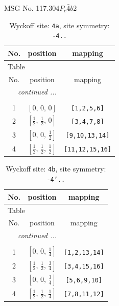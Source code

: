 \documentclass[fleqn,8pt]{jsarticle}
\begin{document}
\setcounter{MaxMatrixCols}{32}

\renewcommand{\tablename}{Table~}
\renewcommand{\figurename}{Figure~}
\begin{center}
\LARGE
MSG No. 117.304\quad$P_{c}\bar{4}b2$
\end{center}
\renewcommand{\arraystretch}{1.2}
\begin{longtable}{ccc}
\caption{Wyckoff site: {\tt 4a}, site symmetry: {\tt -4..}}
 \\
 \hline \hline
No. & position & mapping \\ \hline \endfirsthead

\multicolumn{2}{l}{\tablename\ \thetable{}} \\
 \hline \hline
No. & position & mapping \\ \hline \endhead

 \hline \hline
\multicolumn{2}{r}{\footnotesize\it continued ...} \\ \endfoot

 \hline \hline
\multicolumn{2}{r}{} \\ \endlastfoot

1 & $\left[ 0,\, 0,\, 0 \right]$ & {\tt [1,2,5,6]} \\ \hline
2 & $\left[ \frac{1}{2},\, \frac{1}{2},\, 0 \right]$ & {\tt [3,4,7,8]} \\ \hline
3 & $\left[ 0,\, 0,\, \frac{1}{2} \right]$ & {\tt [9,10,13,14]} \\ \hline
4 & $\left[ \frac{1}{2},\, \frac{1}{2},\, \frac{1}{2} \right]$ & {\tt [11,12,15,16]} \\
\end{longtable}
\renewcommand{\arraystretch}{1.2}
\begin{longtable}{ccc}
\caption{Wyckoff site: {\tt 4b}, site symmetry: {\tt -4'..}}
 \\
 \hline \hline
No. & position & mapping \\ \hline \endfirsthead

\multicolumn{2}{l}{\tablename\ \thetable{}} \\
 \hline \hline
No. & position & mapping \\ \hline \endhead

 \hline \hline
\multicolumn{2}{r}{\footnotesize\it continued ...} \\ \endfoot

 \hline \hline
\multicolumn{2}{r}{} \\ \endlastfoot

1 & $\left[ 0,\, 0,\, \frac{1}{4} \right]$ & {\tt [1,2,13,14]} \\ \hline
2 & $\left[ \frac{1}{2},\, \frac{1}{2},\, \frac{3}{4} \right]$ & {\tt [3,4,15,16]} \\ \hline
3 & $\left[ 0,\, 0,\, \frac{3}{4} \right]$ & {\tt [5,6,9,10]} \\ \hline
4 & $\left[ \frac{1}{2},\, \frac{1}{2},\, \frac{1}{4} \right]$ & {\tt [7,8,11,12]} \\
\end{longtable}
\end{document}
